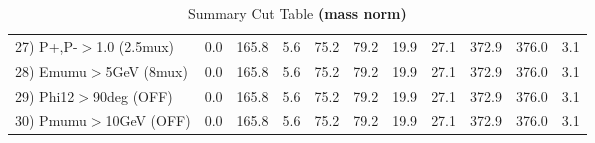 \begin{table}[h!]
{{\begin{tabular}{||l||r|r|r|r|r|r|r||r||r||r||}
 27) P+,P-$>$1.0 (2.5mux) &       0.0 &     165.8 &       5.6 &      75.2 &      79.2 &      19.9 &      27.1 &     372.9 &     376.0 &       3.1 \\
 28) Emumu$>$5GeV  (8mux) &       0.0 &     165.8 &       5.6 &      75.2 &      79.2 &      19.9 &      27.1 &     372.9 &     376.0 &       3.1 \\
 29) Phi12$>$90deg  (OFF) &       0.0 &     165.8 &       5.6 &      75.2 &      79.2 &      19.9 &      27.1 &     372.9 &     376.0 &       3.1 \\
 30) Pmumu$>$10GeV  (OFF) &       0.0 &     165.8 &       5.6 &      75.2 &      79.2 &      19.9 &      27.1 &     372.9 &     376.0 &       3.1 \\
 \hline
 \hline
 \end{tabular}
 \caption{Summary Cut Table \textbf{ (mass norm) }}
 \label{tab-sumcut}
 }}
 \end{table}
 \endinput

